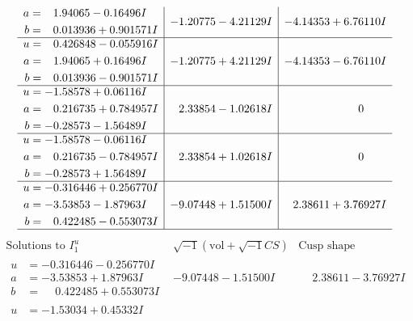 \documentclass[1p]{elsarticle_modified}
\theoremstyle{definition}
\newcommand{\I}{\sqrt{-1}}
\begin{document}
$$\begin{array}{c|c|c}
\begin{aligned}
a &= \phantom{-}1.94065 - 0.16496 I \\
b &= \phantom{-}0.013936 + 0.901571 I\end{aligned}
 & -1.20775 - 4.21129 I & -4.14353 + 6.76110 I \\ \hline\begin{aligned}
u &= \phantom{-}0.426848 - 0.055916 I \\
a &= \phantom{-}1.94065 + 0.16496 I \\
b &= \phantom{-}0.013936 - 0.901571 I\end{aligned}
 & -1.20775 + 4.21129 I & -4.14353 - 6.76110 I \\ \hline\begin{aligned}
u &= -1.58578 + 0.06116 I \\
a &= \phantom{-}0.216735 + 0.784957 I \\
b &= -0.28573 - 1.56489 I\end{aligned}
 & \phantom{-}2.33854 - 1.02618 I & \phantom{-0.000000 } 0 \\ \hline\begin{aligned}
u &= -1.58578 - 0.06116 I \\
a &= \phantom{-}0.216735 - 0.784957 I \\
b &= -0.28573 + 1.56489 I\end{aligned}
 & \phantom{-}2.33854 + 1.02618 I & \phantom{-0.000000 } 0 \\ \hline\begin{aligned}
u &= -0.316446 + 0.256770 I \\
a &= -3.53853 - 1.87963 I \\
b &= \phantom{-}0.422485 - 0.553073 I\end{aligned}
 & -9.07448 + 1.51500 I & \phantom{-}2.38611 + 3.76927 I\\
 \hline 
 \end{array}$$\newpage$$\begin{array}{c|c|c}  
\text{Solutions to }I^u_{1}& \I (\text{vol} + \sqrt{-1}CS) & \text{Cusp shape}\\
 \hline 
\begin{aligned}
u &= -0.316446 - 0.256770 I \\
a &= -3.53853 + 1.87963 I \\
b &= \phantom{-}0.422485 + 0.553073 I\end{aligned}
 & -9.07448 - 1.51500 I & \phantom{-}2.38611 - 3.76927 I \\ \hline\begin{aligned}
u &= -1.53034 + 0.45332 I \\

\end{aligned}
\end{array}$$
\end{document}
